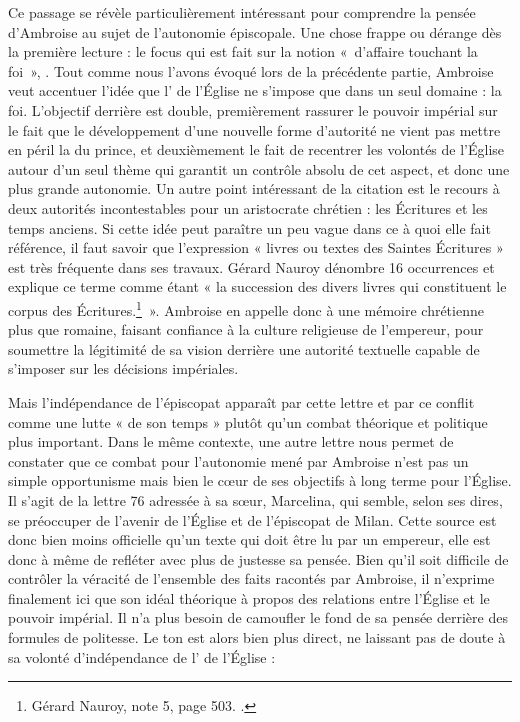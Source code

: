 \bigskip

Ce passage se révèle particulièrement intéressant pour comprendre la pensée d’Ambroise au sujet de l’autonomie épiscopale. Une chose frappe ou dérange dès la première lecture : le focus qui est fait sur la notion «~d’affaire touchant la foi~», . Tout comme nous l'avons évoqué lors de la précédente partie, Ambroise veut accentuer l’idée que l’ de l’Église ne s’impose que dans un seul domaine : la foi. L’objectif derrière est double, premièrement rassurer le pouvoir impérial sur le fait que le développement d’une nouvelle forme d’autorité ne vient pas mettre en péril la  du prince, et deuxièmement le fait de recentrer les volontés de l’Église autour d’un seul thème qui garantit un contrôle absolu de cet aspect, et donc une plus grande autonomie. Un autre point intéressant de la citation est le recours à deux autorités incontestables pour un aristocrate chrétien : les Écritures et les temps anciens. Si cette idée peut paraître un peu vague dans ce à quoi elle fait référence, il faut savoir que l’expression « livres ou textes des Saintes Écritures » est très fréquente dans ses travaux. Gérard Nauroy dénombre 16 occurrences et explique ce terme comme étant « la succession des divers livres qui constituent le corpus des Écritures.\footnote{Gérard Nauroy, note 5, page 503. \cite[,3]{ambroise_lettres}.}~». Ambroise en appelle donc à une mémoire chrétienne plus que romaine, faisant confiance à la culture religieuse de l’empereur, pour soumettre la légitimité de sa vision derrière une autorité textuelle capable de s’imposer sur les décisions impériales.

\bigskip

Mais l’indépendance de l’épiscopat apparaît par cette lettre et par ce conflit comme une lutte « de son temps » plutôt qu’un combat théorique et politique plus important. Dans le même contexte, une autre lettre nous permet de constater que ce combat pour l’autonomie mené par Ambroise n’est pas un simple opportunisme mais bien le cœur de ses objectifs à long terme pour l’Église. Il s’agit de la lettre 76 adressée à sa sœur, Marcelina, qui semble, selon ses dires, se préoccuper de l’avenir de l’Église et de l'épiscopat de Milan. Cette source est donc bien moins officielle qu’un texte qui doit être lu par un empereur, elle est donc à même de refléter avec plus de justesse sa pensée. Bien qu'il soit difficile de contrôler la véracité de l’ensemble des faits racontés par Ambroise, il n’exprime finalement ici que son idéal théorique à propos des relations entre l’Église et le pouvoir impérial. Il n’a plus besoin de camoufler le fond de sa pensée derrière des formules de politesse. Le ton est alors bien plus direct, ne laissant pas de doute à sa volonté d'indépendance de l’ de l’Église :

